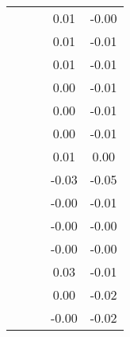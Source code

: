 \begin{table}
\begin{tabular}{c|cc|cc|}
\multicolumn{1}{|c|}{} & \multicolumn{1}{|c|}{} & \multicolumn{1}{|c|}{} & \multicolumn{1}{|c|}{      0.01} & \multicolumn{1}{|c|}{     -0.00} \\ 
\multicolumn{1}{|c|}{} & \multicolumn{1}{|c|}{} & \multicolumn{1}{|c|}{} & \multicolumn{1}{|c|}{      0.01} & \multicolumn{1}{|c|}{     -0.01} \\ 
\multicolumn{1}{|c|}{} & \multicolumn{1}{|c|}{} & \multicolumn{1}{|c|}{} & \multicolumn{1}{|c|}{      0.01} & \multicolumn{1}{|c|}{     -0.01} \\ 
\multicolumn{1}{|c|}{} & \multicolumn{1}{|c|}{} & \multicolumn{1}{|c|}{} & \multicolumn{1}{|c|}{      0.00} & \multicolumn{1}{|c|}{     -0.01} \\ 
\multicolumn{1}{|c|}{} & \multicolumn{1}{|c|}{} & \multicolumn{1}{|c|}{} & \multicolumn{1}{|c|}{      0.00} & \multicolumn{1}{|c|}{     -0.01} \\ 
\multicolumn{1}{|c|}{} & \multicolumn{1}{|c|}{} & \multicolumn{1}{|c|}{} & \multicolumn{1}{|c|}{      0.00} & \multicolumn{1}{|c|}{     -0.01} \\ 
\multicolumn{1}{|c|}{} & \multicolumn{1}{|c|}{} & \multicolumn{1}{|c|}{} & \multicolumn{1}{|c|}{      0.01} & \multicolumn{1}{|c|}{      0.00} \\ 
\multicolumn{1}{|c|}{} & \multicolumn{1}{|c|}{} & \multicolumn{1}{|c|}{} & \multicolumn{1}{|c|}{     -0.03} & \multicolumn{1}{|c|}{     -0.05} \\ 
\multicolumn{1}{|c|}{} & \multicolumn{1}{|c|}{} & \multicolumn{1}{|c|}{} & \multicolumn{1}{|c|}{     -0.00} & \multicolumn{1}{|c|}{     -0.01} \\ 
\multicolumn{1}{|c|}{} & \multicolumn{1}{|c|}{} & \multicolumn{1}{|c|}{} & \multicolumn{1}{|c|}{     -0.00} & \multicolumn{1}{|c|}{     -0.00} \\ 
\multicolumn{1}{|c|}{} & \multicolumn{1}{|c|}{} & \multicolumn{1}{|c|}{} & \multicolumn{1}{|c|}{     -0.00} & \multicolumn{1}{|c|}{     -0.00} \\ 
\multicolumn{1}{|c|}{} & \multicolumn{1}{|c|}{} & \multicolumn{1}{|c|}{} & \multicolumn{1}{|c|}{      0.03} & \multicolumn{1}{|c|}{     -0.01} \\ 
\multicolumn{1}{|c|}{} & \multicolumn{1}{|c|}{} & \multicolumn{1}{|c|}{} & \multicolumn{1}{|c|}{      0.00} & \multicolumn{1}{|c|}{     -0.02} \\ 
\multicolumn{1}{|c|}{} & \multicolumn{1}{|c|}{} & \multicolumn{1}{|c|}{} & \multicolumn{1}{|c|}{     -0.00} & \multicolumn{1}{|c|}{     -0.02} \\ 

\end{tabular}
\end{table}
